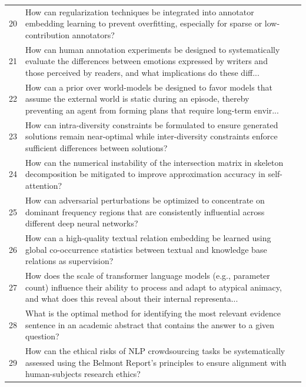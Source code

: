 \begin{longtable}{p{0.8cm}p{9cm}p{2.5cm}}
20 & How can regularization techniques be integrated into annotator embedding learning to prevent overfitting, especially for sparse or low-contribution annotators? & \cite{10.18653/v1/2024.naacl-long.407} \\
21 & How can human annotation experiments be designed to systematically evaluate the differences between emotions expressed by writers and those perceived by readers, and what implications do these diff... & \cite{10.18653/v1/2021.findings-emnlp.219} \\
22 & How can a prior over world-models be designed to favor models that assume the external world is static during an episode, thereby preventing an agent from forming plans that require long-term envir... & \cite{10.1609/aaai.v34i03.5628} \\
23 & How can intra-diversity constraints be formulated to ensure generated solutions remain near-optimal while inter-diversity constraints enforce sufficient differences between solutions? & \cite{10.1609/aaai.v34i02.5512} \\
24 & How can the numerical instability of the intersection matrix in skeleton decomposition be mitigated to improve approximation accuracy in self-attention? & \cite{10.1609/aaai.v36i1.19962} \\
25 & How can adversarial perturbations be optimized to concentrate on dominant frequency regions that are consistently influential across different deep neural networks? & \cite{10.1609/aaai.v38i6.28427} \\
26 & How can a high-quality textual relation embedding be learned using global co-occurrence statistics between textual and knowledge base relations as supervision? & \cite{10.18653/v1/p19-1127} \\
27 & How does the scale of transformer language models (e.g., parameter count) influence their ability to process and adapt to atypical animacy, and what does this reveal about their internal representa... & \cite{10.18653/v1/2023.emnlp-main.744} \\
28 & What is the optimal method for identifying the most relevant evidence sentence in an academic abstract that contains the answer to a given question? & \cite{10.1609/aaai.v33i01.33019855} \\
29 & How can the ethical risks of NLP crowdsourcing tasks be systematically assessed using the Belmont Report’s principles to ensure alignment with human-subjects research ethics? & \cite{10.18653/v1/2021.naacl-main.295} \\

\end{longtable}
